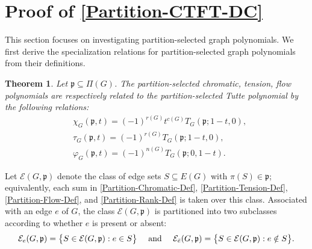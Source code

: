 \documentclass[12pt]{article}%
\numberwithin{equation}{section}
\def\And{\mbox{\rm ~and~}}
\newtheorem{theorem}{Theorem}[section]
\begin{document}
\section{Proof of \autoref{Partition-CTFT-DC}}\label{Sec-2}
This section focuses on investigating partition-selected graph polynomials. We first derive the specialization relations for partition-selected graph polynomials from their definitions.
\begin{theorem}\label{Partition-Relations-CTF-Tutte}
Let $\mathfrak{p}\subseteq\Pi(G)$. The partition-selected chromatic, tension, flow polynomials are respectively related to the partition-selected Tutte polynomial by the following relations:
\begin{align}
&\chi_G(\mathfrak{p},t)=(-1)^{r(G)}t^{c(G)}T_G(\mathfrak{p};1-t,0),\label{Partition-Chromatic-Tutte-Relation}\\
&\tau_G(\mathfrak{p},t)=(-1)^{r(G)}T_G(\mathfrak{p};1-t,0),\label{Partition-Tension-Tutte-Relation}\\
&\varphi_G(\mathfrak{p},t)=(-1)^{n(G)}T_G(\mathfrak{p};0,1-t)\label{Partition-Flow-Tutte-Relation}.
\end{align}
\end{theorem}
Let $\mathcal{E}(G,\mathfrak{p})$ denote the class of edge sets $S\subseteq E(G)$ with $\pi(S)\in\mathfrak{p}$; equivalently, each sum in \eqref{Partition-Chromatic-Def}, \eqref{Partition-Tension-Def}, \eqref{Partition-Flow-Def}, and \eqref{Partition-Rank-Def} is taken over this class. Associated with an edge $e$ of $G$, the class $\mathcal{E}(G,\mathfrak{p})$ is partitioned into two subclasses according to whether $e$ is present or absent:
\begin{equation}\label{Edge-Partition}
\mathcal{E}_e(G,\mathfrak{p})=\big\{S\in\mathcal{E}(G,\mathfrak{p}):e\in S\big\}\quad\And\quad \mathcal{E}_{\bar{e}}(G,\mathfrak{p})=\big\{S\in\mathcal{E}(G,\mathfrak{p}):e\notin S\big\}.
\end{equation}
\end{document}
